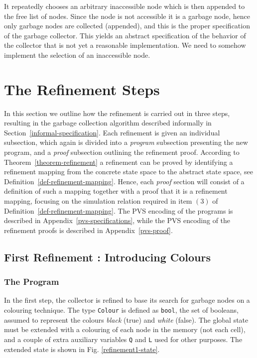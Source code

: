 It repeatedly chooses an arbitrary inaccessible node which  is 
then appended  to  the free list   of  nodes. Since   the  node is not
accessible it     is a garbage   node, hence   only garbage  nodes are
collected  (appended),  and this is the   proper  specification of the
garbage collector.  This yields an abstract specification of the behavior
of the collector that is not yet a reasonable implementation.
We need to somehow implement the selection of an inaccessible node.  


\section{The Refinement Steps}
\label{refinement-steps}

In this section we outline how the refinement  is carried out in three
steps,  resulting  in   the  garbage collection   algorithm  described
informally in Section~\ref{informal-specification}\@.  Each refinement is
given  an individual  subsection, which   again is  divided  into a  {\em
  program}  subsection  presenting  the new program,   and a  {\em proof}
subsection  outlining the  refinement  proof.  According  to
Theorem~\ref{theorem-refinement}  a refinement    can be   proved by
identifying a refinement mapping from the concrete  state space to the
abstract state  space,  see Definition~\ref{def-refinement-mapping}\@.  
Hence, each {\em proof} section will consist of a definition of such a
mapping together with a proof that it is a refinement mapping, focusing
on   the  simulation relation required in  item $(3)$ of
Definition~\ref{def-refinement-mapping}\@.  The   PVS encoding  of  the
programs is described in  Appendix~\ref{pvs-specifications}, while the PVS 
encoding of the refinement proofs is described in Appendix~\ref{pvs-proof}\@.


\subsection{First Refinement : Introducing Colours}
\label{first-refinement}

\subsubsection{The Program}

In  the first step, the  collector is refined  to base  its search for
garbage nodes  on a colouring  technique.  The  type {\tt  Colour}  is
defined as {\tt bool},  the set of  booleans, assumed to represent the
colours {\em black}   (true) and {\em  white} (false)\@.    The global
state must be  extended with  a colouring  of each node  in the memory
(not each cell), and a couple of extra auxiliary variables {\tt Q} and
{\tt L} used for other purposes.  The extended state is shown in Fig. 
\ref{refinement1-state}.

